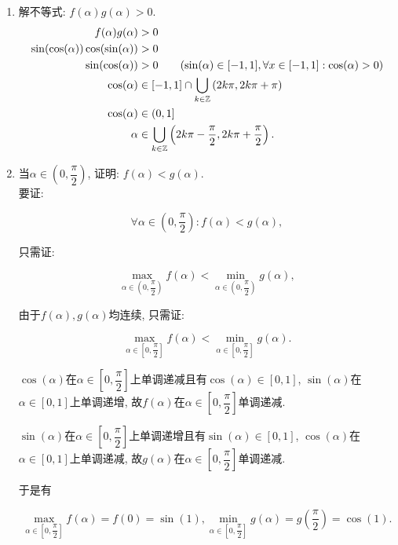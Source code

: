 \documentclass[8pt]{article}
\begin{document}
			\begin{enumerate}[label=(\arabic*)]
				\item 解不等式: $f(\alpha)g(\alpha)>0$.
					~\\

					\begin{align*}
					f(\alpha)g(\alpha)&>0\\
					\sin(\cos(\alpha))\cos(\sin(\alpha))&>0\\
					\sin(\cos(\alpha))&>0\tag{$\sin(\alpha)\in[-1, 1], \forall x \in [-1, 1]: \cos(\alpha)>0$}\\
					\cos(\alpha)&\in [-1, 1]\cap\bigcup_{k\in\mathbb{Z}}\left(2k\pi, 2k\pi + \pi\right)\\
					\cos(\alpha)&\in (0, 1]\\
					\alpha&\in \bigcup_{k\in\mathbb{Z}} \left(2k\pi - \frac{\pi}{2}, 2k\pi + \frac{\pi}{2}\right).
					\end{align*}

				\item 当$\alpha\in\left(0, \dfrac{\pi}{2}\right)$, 证明: $f(\alpha)<g(\alpha)$.
					~\\

					要证:

					$$\forall \alpha\in\left(0, \dfrac{\pi}{2}\right): f(\alpha) < g(\alpha),$$

					只需证:

					$$\max_{\alpha\in\left(0, \dfrac{\pi}{2}\right)} f(\alpha) < \min_{\alpha\in\left(0, \dfrac{\pi}{2}\right)} g(\alpha),$$

					由于$f(\alpha),  g(\alpha)$均连续, 只需证:

					$$\max_{\alpha\in\left[0, \dfrac{\pi}{2}\right]} f(\alpha) < \min_{\alpha \in \left[0, \dfrac{\pi}{2}\right]} g(\alpha).$$

					$\cos(\alpha)$在$\alpha\in\left[0, \dfrac{\pi}{2}\right]$上单调递减且有$\cos(\alpha)\in[0, 1]$, $\sin(\alpha)$在$\alpha\in[0, 1]$上单调递增, 故$f(\alpha)$在$\alpha\in\left[0, \dfrac{\pi}{2}\right]$单调递减.

					$\sin(\alpha)$在$\alpha\in\left[0, \dfrac{\pi}{2}\right]$上单调递增且有$\sin(\alpha)\in[0, 1]$, $\cos(\alpha)$在$\alpha\in[0, 1]$上单调递减, 故$g(\alpha)$在$\alpha\in\left[0, \dfrac{\pi}{2}\right]$单调递减.

					于是有

					$$\max_{\alpha\in\left[0, \dfrac{\pi}{2}\right]} f(\alpha) = f(0) = \sin(1), \min_{\alpha \in \left[0, \dfrac{\pi}{2}\right]} g(\alpha) = g\left(\frac{\pi}{2}\right)=\cos(1).$$


\end{enumerate}
\end{document}
